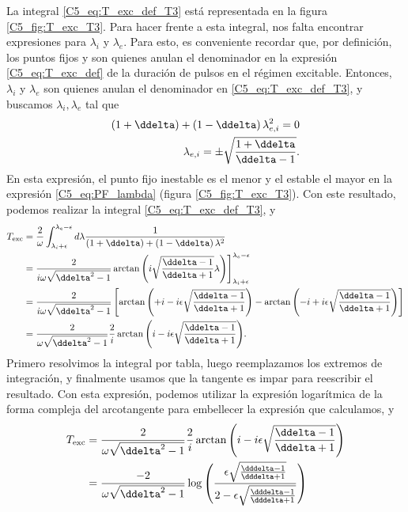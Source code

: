 {La integral \ref{C5_eq:T_exc_def_T3} está representada en la figura \ref{C5_fig:T_exc_T3}. Para hacer frente a esta integral, nos falta encontrar expresiones para $\lambda_i$ y $\lambda_e$. Para esto, es conveniente recordar que, por definición, los puntos fijos \xxi y \xxe son quienes anulan el denominador en la expresión \ref{C5_eq:T_exc_def} de la duración de pulsos en el régimen excitable. Entonces, $\lambda_i$ y $\lambda_e$ son quienes anulan el denominador en \ref{C5_eq:T_exc_def_T3}, y buscamos $\lambda_i,\lambda_e$ tal que 
\begin{align}
    \left(1+\ddelta \right) + \left(1-\ddelta \right) \lambda_{e,i}^2 = 0\\
    \lambda_{e,i} = \pm \sqrt{\frac{1+\ddelta}{\ddelta-1}}. \label{C5_eq:PF_lambda}
\end{align}
En esta expresión, el punto fijo inestable es el menor y el estable el mayor en la expresión \ref{C5_eq:PF_lambda} (figura \ref{C5_fig:T_exc_T3}). Con este resultado, podemos realizar la integral \ref{C5_eq:T_exc_def_T3}, y
\begin{align}
    T_{\text{exc}} &= \frac{2}{\omega}\int_{\lambda_i + \epsilon}^{\lambda_e - \epsilon} d\lambda \frac{1}{\left(1+\ddelta\right) + \left(1-\ddelta\right) \lambda^2} \\
    &= \frac{2}{i\omega \sqrt{\ddelta^2 - 1}} \arctan{\left(i\sqrt{\frac{\ddelta - 1}{\ddelta + 1} } \lambda\right)} \Bigg]_{\lambda_i + \epsilon}^{\lambda_e - \epsilon} \nonumber\\
    &= \frac{2}{i \omega \sqrt{\ddelta^2 - 1}}  \left[ \arctan{\left( +i - i \epsilon \sqrt{\frac{\ddelta - 1}{\ddelta + 1}}\right)}  - \arctan{\left( -i +i \epsilon \sqrt{\frac{\ddelta - 1}{\ddelta + 1}}\right)} \right] \nonumber\\
    &= \frac{2}{\omega \sqrt{\ddelta^2 - 1}}  \frac{2}{i} \arctan{\left( i - i \epsilon \sqrt{\frac{\ddelta - 1}{\ddelta + 1}}\right)}.
\end{align}
Primero resolvimos la integral por tabla, luego reemplazamos los extremos de integración, y finalmente usamos que la tangente es impar para reescribir el resultado. Con esta expresión, podemos utilizar la expresión logarítmica de la forma compleja del arcotangente para embellecer la expresión que calculamos, y 
\begin{align}
    T_{\text{exc}} &= \frac{2}{\omega \sqrt{\ddelta^2 - 1}}  \frac{2}{i} \arctan{\left( i - i \epsilon \sqrt{\frac{\ddelta - 1}{\ddelta + 1}}\right)}\\ 
    &= \frac{-2}{ \omega \sqrt{\ddelta^2 - 1}}  \log{\left( \frac{\epsilon \sqrt{\frac{\dddelta - 1}{\dddelta + 1}}}{2-\epsilon \sqrt{\frac{\dddelta - 1}{\dddelta + 1}}}\right)}

\end{align}}
